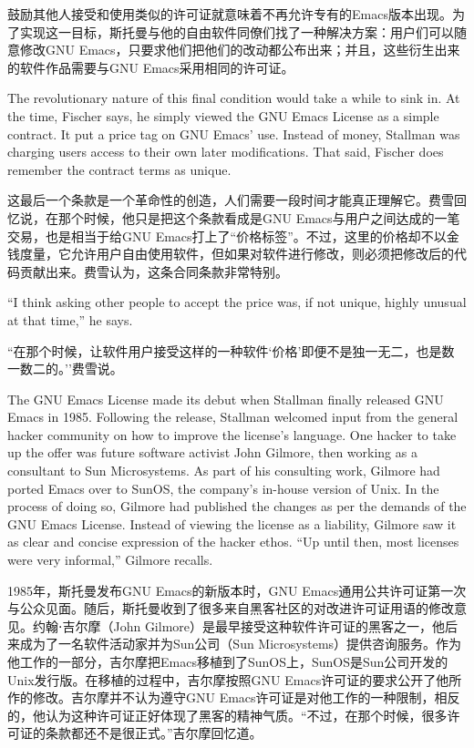 \ifdefined\chs
鼓励其他人接受和使用类似的许可证就意味着不再允许专有的Emacs版本出现。为了实现这一目标，斯托曼与他的自由软件同僚们找了一种解决方案：用户们可以随意修改GNU Emacs，只要求他们把他们的改动都公布出来；并且，这些衍生出来的软件作品需要与GNU Emacs采用相同的许可证。
\fi

\ifdefined\eng
The revolutionary nature of this final condition would take a while to sink in. At the time, Fischer says, he simply viewed the GNU Emacs License as a simple contract. It put a price tag on GNU Emacs' use. Instead of money, Stallman was charging users access to their own later modifications. That said, Fischer does remember the contract terms as unique.
\fi

\ifdefined\chs
这最后一个条款是一个革命性的创造，人们需要一段时间才能真正理解它。费雪回忆说，在那个时候，他只是把这个条款看成是GNU Emacs与用户之间达成的一笔交易，也是相当于给GNU Emacs打上了``价格标签''。不过，这里的价格却不以金钱度量，它允许用户自由使用软件，但如果对软件进行修改，则必须把修改后的代码贡献出来。费雪认为，这条合同条款非常特别。
\fi

\ifdefined\eng
``I think asking other people to accept the price was, if not unique, highly unusual at that time,'' he says.
\fi

\ifdefined\chs
``在那个时候，让软件用户接受这样的一种软件`价格'即便不是独一无二，也是数一数二的。''费雪说。
\fi

\ifdefined\eng
The GNU Emacs License made its debut when Stallman finally released GNU Emacs in 1985. Following the release, Stallman welcomed input from the general hacker community on how to improve the license's language. One hacker to take up the offer was future software activist John Gilmore, then working as a consultant to Sun Microsystems. As part of his consulting work, Gilmore had ported Emacs over to SunOS, the company's in-house version of Unix. In the process of doing so, Gilmore had published the changes as per the demands of the GNU Emacs License. Instead of viewing the license as a liability, Gilmore saw it as clear and concise expression of the hacker ethos. ``Up until then, most licenses were very informal,'' Gilmore recalls.
\fi

\ifdefined\chs
1985年，斯托曼发布GNU Emacs的新版本时，GNU Emacs通用公共许可证第一次与公众见面。随后，斯托曼收到了很多来自黑客社区的对改进许可证用语的修改意见。约翰⋅吉尔摩（John Gilmore）是最早接受这种软件许可证的黑客之一，他后来成为了一名软件活动家并为Sun公司（Sun Microsystems）提供咨询服务。作为他工作的一部分，吉尔摩把Emacs移植到了SunOS上，SunOS是Sun公司开发的Unix发行版。在移植的过程中，吉尔摩按照GNU Emacs许可证的要求公开了他所作的修改。吉尔摩并不认为遵守GNU Emacs许可证是对他工作的一种限制，相反的，他认为这种许可证正好体现了黑客的精神气质。``不过，在那个时候，很多许可证的条款都还不是很正式。''吉尔摩回忆道。
\fi

